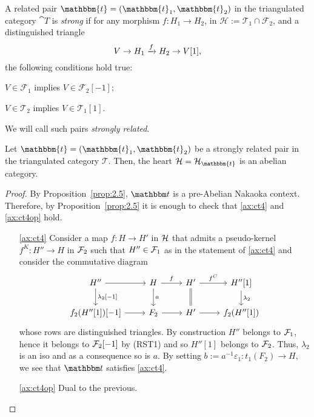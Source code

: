 \begin{definition}\label{def:strongly_related}
  A related pair $\mathbbm{t}=(\mathbbm{t}_1,\mathbbm{t}_2)$ in the triangulated category
  $\cat{T}$ is \emph{strong} if for any morphism $f:H_1\to H_2$, in $\mathcal{H}:=\mathcal{T}_1\cap\mathcal{F}_2$,
  and a distinguished triangle \[ V\to H_1\xrightarrow{f}H_2\to V[1],\] the following conditions
  hold true:
  \begin{relatedtorsion}
  \item\label{ax:rst1} $V\in\mathcal{F}_1$ implies $V\in\mathcal{F}_2[-1]$;
  \item\label{ax:rst2} $V\in\mathcal{T}_2$ implies $V\in\mathcal{T}_1[1]$.
  \end{relatedtorsion}

  We will call such pairs \emph{strongly related}.
\end{definition}

\begin{thm}\label{thm:2.6-tria}
  Let $\mathbbm{t}=(\mathbbm{t}_1,\mathbbm{t}_2)$ be a strongly related pair in
  the triangulated category $\mathcal{T}$. Then, the heart $\mathcal{H}=\mathcal{H}_\mathbbm{t}$
  is an abelian category.
\end{thm}

\begin{proof}
  By Proposition~\ref{prop:2.5}, $\t$ is a pre-Abelian Nakaoka context. Therefore, by Proposition~\ref{prop:2.5} it is enough to check that \ref{ax:ct4} and \ref{ax:ct4op} hold.

  \begin{itemize}
    \item[\ref{ax:ct4}] Consider a map $f\colon H\to H'$ in $\mathcal{H}$ that admits a pseudo-kernel $f^K\colon H''\to H$ in $\mathcal{F}_2$ such that $H''\in\mathcal{F}_1$ as in the statement of \ref{ax:ct4} and consider the commutative diagram
      \begin{equation*}
        \begin{tikzcd}
          H''\arrow{r}\arrow{d}{\lambda_2[-1]}
          & H\arrow{r}{f}\arrow{d}{a}
          & H'\arrow{r}{f^C}\arrow[equal]{d}
          & H''[1]\arrow{d}{\lambda_2}\\
          f_2(H''[1])[-1]\arrow{r}
          & F_2\arrow{r}
          & H'\arrow{r}
          & f_2(H''[1])
        \end{tikzcd}
      \end{equation*}
      whose rows are distinguished triangles. By construction $H''$ belongs to $\mathcal{F}_1$, hence it belongs to $\mathcal{F}_2[-1]$ by (RST1) and so $H''[1]$ belongs to $\mathcal{F}_2$. Thus, $\lambda_2$ is an iso and as a consequence so is $a$. By setting $b:= a^{-1}\varepsilon_1\colon t_1(F_2)\to H$, we see that $\t$ satisfies \ref{ax:ct4}.
    \item[\ref{ax:ct4op}] Dual to the previous.
  \end{itemize}
\end{proof}

